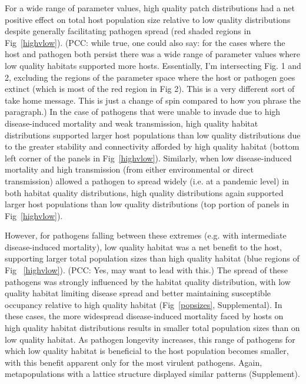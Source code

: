 \documentclass{article}
\begin{document}
For a wide range of parameter values, high quality patch distributions had a net positive effect on total host population size relative to low quality distributions despite generally facilitating pathogen spread (red shaded regions in Fig~\ref{highvlow}).  (PCC: while true, one could also say: for the cases where the host and pathogen both persist there was a wide range of parameter values where low quality habitats supported more hosts.  Essentially, I'm intersecting Fig. 1 and 2, excluding the regions of the parameter space where the host or pathogen goes extinct (which is most of the red region in Fig 2). This is a very different sort of take home message. This is just a change of spin compared to how you phrase the paragraph.)
In the case of pathogens that were unable to invade due to high disease-induced mortality and weak transmission, high quality habitat distributions supported larger host populations than low quality distributions due to the greater stability and connectivity afforded by high quality habitat (bottom left corner of the panels in Fig~\ref{highvlow}). 
Similarly, when low disease-induced mortality and high transmission (from either environmental or direct transmission) allowed a pathogen to spread widely (i.e. at a pandemic level) in both habitat quality distributions, high quality distributions again supported larger host populations than low quality distributions (top portion of panels in Fig~\ref{highvlow}).

However, for pathogens falling between these extremes (e.g. with intermediate disease-induced mortality), low quality habitat was a net benefit to the host, supporting larger total population sizes than high quality habitat (blue regions of Fig ~\ref{highvlow}). (PCC: Yes, may want to lead with this.)
The spread of these pathogens was strongly influenced by the habitat quality distribution, with low quality habitat limiting disease spread and better maintaining susceptible occupancy relative to high quality habitat (Fig~\ref{popsizes}, Supplemental).
In these cases, the more widespread disease-induced mortality faced by hosts on high quality habitat distributions results in smaller total population sizes than on low quality habitat.
As pathogen longevity increases, this range of pathogens for which low quality habitat is beneficial to the host population becomes smaller, with this benefit apparent only for the most virulent pathogens.
Again, metapopulations with a lattice structure displayed similar patterns (Supplement).
\end{document}
